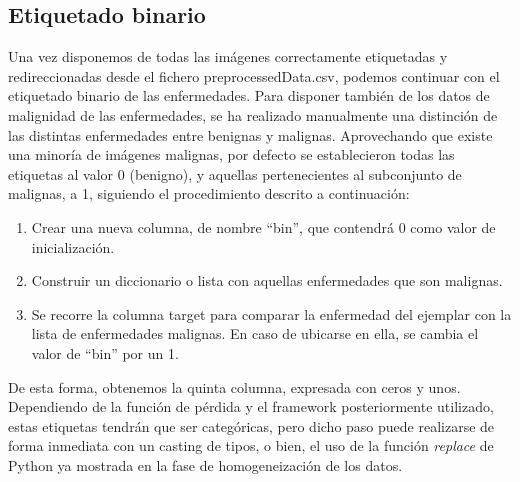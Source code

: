  \subsection{Etiquetado binario}
 
Una vez disponemos de todas las imágenes correctamente etiquetadas y redireccionadas desde el fichero preprocessedData.csv, podemos continuar con el etiquetado binario de las enfermedades. Para disponer también de los datos de malignidad de las enfermedades, se ha realizado manualmente una distinción de las distintas enfermedades entre benignas y malignas. Aprovechando que existe una minoría de imágenes malignas, por defecto se establecieron todas las etiquetas al valor 0 (benigno), y aquellas pertenecientes al subconjunto de malignas, a 1, siguiendo el procedimiento descrito a continuación:
 
 \begin{enumerate}
 	\item Crear una nueva columna, de nombre ``bin'', que contendrá 0 como valor de inicialización.
 	\item Construir un diccionario o lista con aquellas enfermedades que son malignas.
 	\item Se recorre la columna target para comparar la enfermedad del ejemplar con la lista de enfermedades malignas. En caso de ubicarse en ella, se cambia el valor de ``bin'' por un 1.
\end{enumerate}

De esta forma, obtenemos la quinta columna, expresada con ceros y unos. Dependiendo de la función de pérdida y el framework posteriormente utilizado, estas etiquetas tendrán que ser categóricas, pero dicho paso puede realizarse de forma inmediata con un casting de tipos, o bien, el uso de la función \textit{replace} de Python ya mostrada en la fase de homogeneización de los datos.


